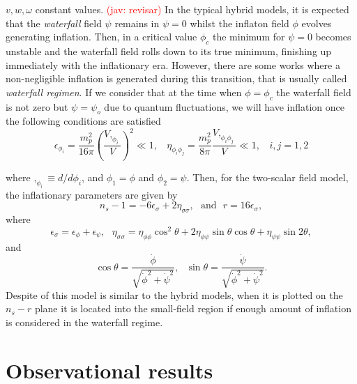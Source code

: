 \documentclass{rmaa}
\newcommand{\jav}[1]{\textcolor{red}{(jav: #1)}}
\begin{document}
$v, w, \omega$ constant values. \jav{revisar}
In the typical hybrid models, it is expected that the \textit{waterfall} field $\psi$ remains in $\psi=0$ 
whilst the inflaton field $\phi$ evolves generating inflation. 
Then, in a critical value $\phi_c$ the minimum for $\psi=0$ becomes unstable and the waterfall 
field rolls down to its true minimum, finishing up immediately with the inflationary era. 
However, there are some works where a non-negligible inflation is generated during this transition, 
that is usually called \textit{waterfall regimen}. 
If we consider that at the time when $\phi=\phi_c$ the waterfall field is not zero 
but $\psi=\psi_o$ due to quantum fluctuations, we will have inflation once the following conditions are satisfied
%
\begin{equation}\label{parameterssr1}
\epsilon_{\phi_i}=\frac{m_p^2}{16\pi}\left(\frac{V,_{\phi_i}}{V}\right)^2\ll 1, \ \ \ \ 	\eta_{\phi_i \phi_j}=\frac{m_p^2}{8\pi}\frac{V,_{\phi_i\phi_j}}{V}\ll 1, \ \ \ \ i,j=1,2
\end{equation}

where $,_{\phi_i}\equiv d/d\phi_i$, and $\phi_1=\phi$ and $\phi_2=\psi$. Then, for the two-scalar field model, the inflationary parameters are given by
\begin{equation}
n_s-1=-6\epsilon_\sigma+2\eta_{\sigma\sigma}, \ \ \ \text{and}\ \ \ r=16\epsilon_\sigma,
\end{equation}
where
\begin{equation}
\epsilon_\sigma=\epsilon_\phi+\epsilon_\psi, \ \ \ \eta_{\sigma\sigma}=\eta_{\phi\phi}\cos^2\theta+2\eta_{\phi\psi}\sin\theta\cos\theta+\eta_{\psi\psi}\sin 2\theta,
\end{equation}
and
\begin{equation}
\cos\theta=\frac{\dot{\phi}}{\sqrt{\dot{\phi}^2+\dot{\psi}^2}}, \ \ \ \sin\theta=\frac{\dot{\psi}}{\sqrt{\dot{\phi}^2+\dot{\psi}^2}}.
\end{equation}
Despite of this model is similar to the hybrid models, when it is plotted on the $n_s-r$ plane 
it is located into the small-field region if enough amount of inflation is considered in the waterfall regime.

 
\section{Observational results}
\end{document}
